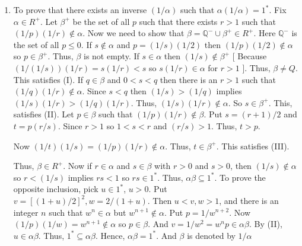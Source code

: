 \begin{enumerate}[{\bf Step 1.}]
\begin{enumerate}[(M1)]
	\item To prove that there exists an inverse $(1/\alpha)$ such that $\alpha (1 / \alpha) = 1^*$.
	\bigbreak
	Fix $\alpha \in R^+$. Let $\beta^+$ be the set of all $p$ such that there exists $r > 1$ such that $(1/p)(1/r) \notin \alpha$.
	\bigbreak
	Now we need to show that $\beta = \mathbb{Q}^- \cup \beta^+ \in R^+$. Here $\mathbb{Q}^-$ is the set of all $p \leq 0$.
	\bigbreak \quad
	If $s \notin \alpha$ and $p = (1/s)(1/2)$ then $(1/p)(1/2) \notin \alpha$ so $p \in \beta^+$. Thus, $\beta$ is not empty.
	If $s \in \alpha$ then $(1/s) \notin \beta^+$
	[ Because $(1/(1/s))(1/r) = s(1/r) < s$ so $s(1/r) \in \alpha$ for $r > 1$ ].
	Thus, $\beta \neq Q$.
	This satisfies (I).
	\bigbreak \quad
	If $q \in \beta$ and $0 < s < q$ then there is an $r > 1$ such that $(1/q)(1/r) \notin \alpha$.
	Since $s < q$ then $(1/s) > (1/q)$ implies $(1/s)(1/r) > (1/q)(1/r)$. Thus, $(1/s)(1/r) \notin \alpha$.
	So $s \in \beta^+$. This, satisfies (II).
	\bigbreak \quad
	Let $p \in \beta$ such that $(1/p)(1/r) \notin \beta$.
	Put $s = (r+1)/2$ and $t = p(r/s)$. Since $r > 1$ so $1 < s < r$ and $(r/s) > 1$.
	Thus, $t > p$.

	Now $(1/t)(1/s) = (1/p)(1/r) \notin \alpha$. Thus, $t \in \beta^+$.
	This satisfies (III).

	Thus, $\beta \in R^+$.
	\bigbreak \quad
	Now if $r \in \alpha$ and $s \in \beta$ with $r > 0$ and $s > 0$,
	then $(1/s) \notin \alpha$ so $r < (1/s)$ implies $rs < 1$ so $rs \in 1^*$.
	Thus, $\alpha \beta \subseteq 1^*$.
	\bigbreak \quad
	To prove the opposite inclusion, pick $u \in 1^*$, $u > 0$.
	Put $v=[(1+u)/2]^2, w=2/(1+u)$. Then $u < v, w > 1$, and there is an integer $n$
	such that $w^n \in \alpha$ but $w^{n+1} \notin \alpha$.
	\bigbreak \quad
	Put $p = 1 / w^{n+2}$. Now $(1/p)(1/w) = w^{n+1} \notin \alpha$ so $p \in \beta$.
	And $v = 1/w^2 = w^n p \in \alpha \beta$. By (II), $u \in \alpha \beta$. Thus, $1^* \subseteq \alpha \beta$.
	\bigbreak
	Hence, $\alpha \beta = 1^*$. And $\beta$ is denoted by $1 / \alpha$



\end{enumerate}
\end{enumerate}
